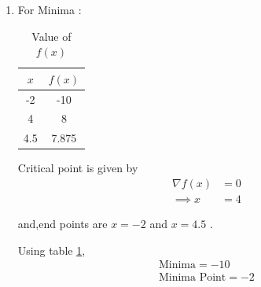 \documentclass[journal,12pt,twocolumn]{IEEEtran}
\begin{document}
\begin{enumerate}
    \item For Minima : \\
    
    \begin{table}[!ht]
    \centering
    \begin{tabular}{|c|c|} 
    \hline
    $x$ & $f(x)$ \\
    \hline
    -2 & -10 \\
    \hline
    4 & 8 \\
    \hline
    4.5 & 7.875 \\
    \hline
    \end{tabular}
    \caption{Value of $f(x)$}
    \label{tab:table1}
    \end{table}
    
    Critical point is given by
    \begin{align}
        \nabla f(x) &= 0 \\
        \implies x &= 4
    \end{align}
    
    and,end points are $x=-2$ and $x=4.5$ .
    
    Using table \ref{tab:table1},
    \begin{align}
        \boxed{\text{Minima} = -10}\\
        \boxed{\text{Minima Point} = -2}
    \end{align}
    
\end{enumerate}
\end{document}
